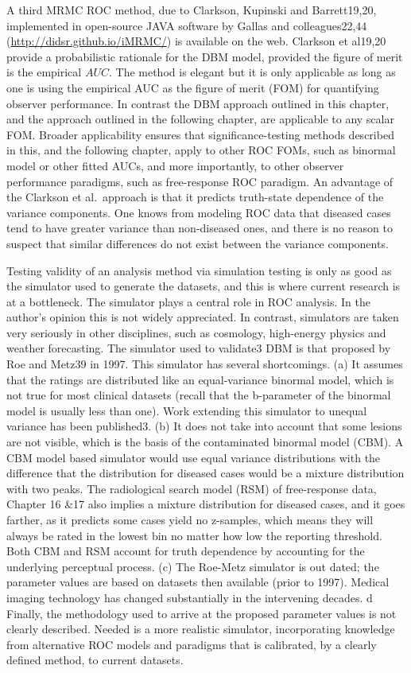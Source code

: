\documentclass[
]{book}
\begin{document}
A third MRMC ROC method, due to Clarkson, Kupinski and Barrett19,20, implemented in open-source JAVA software by Gallas and colleagues22,44 (\url{http://didsr.github.io/iMRMC/}) is available on the web. Clarkson et al19,20 provide a probabilistic rationale for the DBM model, provided the figure of merit is the empirical \(AUC\). The method is elegant but it is only applicable as long as one is using the empirical AUC as the figure of merit (FOM) for quantifying observer performance. In contrast the DBM approach outlined in this chapter, and the approach outlined in the following chapter, are applicable to any scalar FOM. Broader applicability ensures that significance-testing methods described in this, and the following chapter, apply to other ROC FOMs, such as binormal model or other fitted AUCs, and more importantly, to other observer performance paradigms, such as free-response ROC paradigm. An advantage of the Clarkson et al.~approach is that it predicts truth-state dependence of the variance components. One knows from modeling ROC data that diseased cases tend to have greater variance than non-diseased ones, and there is no reason to suspect that similar differences do not exist between the variance components.

Testing validity of an analysis method via simulation testing is only as good as the simulator used to generate the datasets, and this is where current research is at a bottleneck. The simulator plays a central role in ROC analysis. In the author's opinion this is not widely appreciated. In contrast, simulators are taken very seriously in other disciplines, such as cosmology, high-energy physics and weather forecasting. The simulator used to validate3 DBM is that proposed by Roe and Metz39 in 1997. This simulator has several shortcomings. (a) It assumes that the ratings are distributed like an equal-variance binormal model, which is not true for most clinical datasets (recall that the b-parameter of the binormal model is usually less than one). Work extending this simulator to unequal variance has been published3. (b) It does not take into account that some lesions are not visible, which is the basis of the contaminated binormal model (CBM). A CBM model based simulator would use equal variance distributions with the difference that the distribution for diseased cases would be a mixture distribution with two peaks. The radiological search model (RSM) of free-response data, Chapter 16 \&17 also implies a mixture distribution for diseased cases, and it goes farther, as it predicts some cases yield no z-samples, which means they will always be rated in the lowest bin no matter how low the reporting threshold. Both CBM and RSM account for truth dependence by accounting for the underlying perceptual process. (c) The Roe-Metz simulator is out dated; the parameter values are based on datasets then available (prior to 1997). Medical imaging technology has changed substantially in the intervening decades. d Finally, the methodology used to arrive at the proposed parameter values is not clearly described. Needed is a more realistic simulator, incorporating knowledge from alternative ROC models and paradigms that is calibrated, by a clearly defined method, to current datasets.
\end{document}
